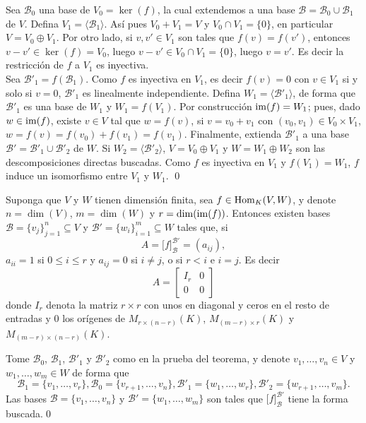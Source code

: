 \dem Sea $\mathcal{B}_0$ una base de $V_0=\ker(f)$, la cual extendemos a una base $\mathcal{B}=\mathcal{B}_0\cup \mathcal{B}_1$ de $V$. Defina $V_1=\langle \mathcal{B}_1\rangle$. As\'i pues $V_0+V_1=V$ y $V_0\cap V_1=\{0\}$, en particular $V=V_0\oplus V_1$. Por otro lado, si $v,v'\in V_1$ son tales que $f(v)=f(v')$, entonces $v-v'\in \ker(f)=V_0$, luego $v-v'\in V_0\cap V_1=\{0\}$, luego $v=v'$. Es decir la restricci\'on de $f$ a $V_1$ es inyectiva.\\
Sea $\mathcal{B}'_1=f(\mathcal{B}_1)$. Como $f$ es inyectiva en $V_1$, es decir $f(v)=0$ con $v\in V_1$ si y solo si $v=0$, $\mathcal{B}'_1$ es linealmente independiente. Defina $W_1=\langle \mathcal{B}'_1\rangle$, de forma que $\mathcal{B}'_1$ es una base de $W_1$ y $W_1=f(V_1)$. Por construcci\'on $\operatorname{im}(f)=W_1$; pues, dado $w\in\operatorname{im}(f)$, existe $v\in V$ tal que $w=f(v)$, si $v=v_0+v_1$ con $(v_0,v_1)\in V_0\times V_1$, $w=f(v)=f(v_0)+f(v_1)=f(v_1)$. Finalmente, extienda $\mathcal{B}'_1$ a una base $\mathcal{B}'=\mathcal{B}'_1\cup \mathcal{B}'_2$ de $W$. Si $W_2=\langle \mathcal{B}'_2\rangle$, $V=V_0\oplus V_1$ y $W=W_1\oplus W_2$ son las descomposiciones directas buscadas. Como $f$ es inyectiva en $V_1$ y $f(V_1)=W_1$, $f$ induce un isomorfismo entre $V_1$ y $W_1$. \qed

\begin{coro}
Suponga que $V$ y $W$ tienen dimensi\'on finita, sea $f\in\operatorname{Hom}_K(V,W)$, y denote $n=\dim(V)$, $m=\dim(W)$ y $r=\dim(\operatorname{im}(f))$. Entonces existen bases $\mathcal{B}=\{v_j\}_{j=1}^n\subseteq V$ y $\mathcal{B}'=\{w_i\}_{i=1}^m\subseteq W$ tales que, si
\[
A=\Big[f\Big]^{\mathcal{B}'}_{\mathcal{B}}=(a_{ij}),
\]
$a_{ii}=1$ si $0\le i\le r$ y $a_{ij}=0$ si $i\ne j$, o si $r<i$ e $i=j$. Es decir
\[
A=\left[\begin{array}{c|c}
I_r & 0\\
\hline
0   & 0
\end{array}\right]
\]
donde $I_r$ denota la matriz $r\times r$ con unos en diagonal y ceros en el resto de entradas y $0$ los or\'igenes de $M_{r\times (n-r)}(K)$, $M_{(m-r)\times r}(K)$ y $M_{(m-r)\times(n-r)}(K)$.
\end{coro}

\dem Tome $\mathcal{B}_0$, $\mathcal{B}_1$, $\mathcal{B}'_1$ y $\mathcal{B}'_2$ como en la prueba del teorema, y denote $v_1,\ldots,v_n\in V$ y $w_1,\ldots,w_m\in W$ de forma que
\[
\mathcal{B}_1=\{v_1,\ldots,v_r\}, \mathcal{B}_0=\{v_{r+1},\ldots,v_n\}, \mathcal{B}'_1=\{w_1,\ldots,w_r\}, \mathcal{B}'_2=\{w_{r+1},\ldots,v_m\}.
\]
Las bases $\mathcal{B}=\{v_1,\ldots,v_n\}$ y $\mathcal{B}'=\{w_1,\ldots,w_m\}$ son tales que $\Big[f\Big]^{\mathcal{B}'}_{\mathcal{B}}$ tiene la forma buscada.\qed

